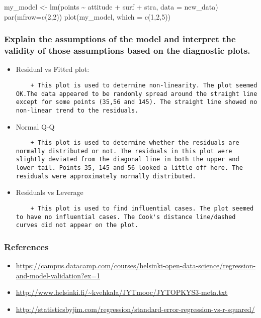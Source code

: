 \documentclass[]{article}
\begin{document}
my\_model \textless{}- lm(points \textasciitilde{} attitude + surf +
stra, data = new\_data) par(mfrow=c(2,2)) plot(my\_model, which =
c(1,2,5))

\subsubsection{Explain the assumptions of the model and interpret the
validity of those assumptions based on the diagnostic
plots.}\label{explain-the-assumptions-of-the-model-and-interpret-the-validity-of-those-assumptions-based-on-the-diagnostic-plots.}

\begin{itemize}
\item
  Residual vs Fitted plot:

\begin{verbatim}
    + This plot is used to determine non-linearity. The plot seemed OK.The data appeared to be randomly spread around the straight line except for some points (35,56 and 145). The straight line showed no non-linear trend to the residuals.
\end{verbatim}
\item
  Normal Q-Q

\begin{verbatim}
    + This plot is used to determine whether the residuals are normally distributed or not. The residuals in this plot were slightly deviated from the diagonal line in both the upper and lower tail. Points 35, 145 and 56 looked a little off here. The residuals were approximately normally distributed.
\end{verbatim}
\item
  Residuals vs Leverage

\begin{verbatim}
    + This plot is used to find influential cases. The plot seemed to have no influential cases. The Cook's distance line/dashed curves did not appear on the plot.
\end{verbatim}
\end{itemize}

\subsubsection{References}\label{references}

\begin{itemize}
\item
  \url{https://campus.datacamp.com/courses/helsinki-open-data-science/regression-and-model-validation?ex=1}
\item
  \url{http://www.helsinki.fi/~kvehkala/JYTmooc/JYTOPKYS3-meta.txt}
\item
  \url{http://statisticsbyjim.com/regression/standard-error-regression-vs-r-squared/}
\end{itemize}
\end{document}

